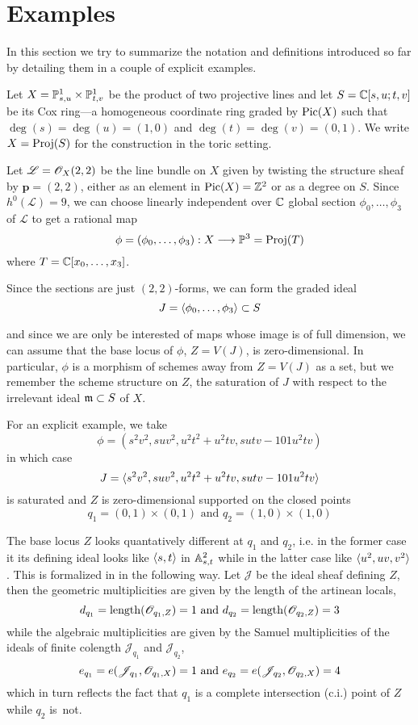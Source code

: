 \documentclass[fleqn,reqno]{amsart}
\numberwithin{first}{chapter}
\begin{document}
\section{Examples}

In this section we try to summarize the notation and definitions introduced so far
by detailing them in a couple of explicit examples.

\begin{example}[$\mt{ex203}$]
\label{ex203}
Let $X=\PP^1_{s,u}\times\PP^1_{t,v}$ be the product of two projective lines and let $S=\CC[s,u;t,v]$
be its Cox ring---a homogeneous coordinate ring graded by $\Pic(X)$ such that $\deg(s)=\deg(u)=(1,0)$
and $\deg(t)=\deg(v)=(0,1)$.
We write $X=\Proj(S)$ for the construction in the toric setting.

Let $\mathscr{L}=\O_X(2,2)$ be the line bundle on $X$ given by twisting the structure sheaf by
$\mathbf p=(2,2)$, either as an element in $\Pic(X)=\ZZ^2$ or as a degree on $S$.
Since $h^0(\mathscr{L})=9$, we can choose  linearly independent over $\CC$
global section $\phi_0,\ldots,\phi_3$ of $\mathscr{L}$ to get a rational map
\[
	\phi=(\phi_0,\ldots,\phi_3):X\To\PP^3=\Proj(T)
\]
where $T=\CC[x_0,\ldots,x_3]$.

Since the sections are just $(2,2)$-forms, we can form the graded ideal
\[
	J=\la \phi_0,\ldots,\phi_3\ra\se S
\]

and since we are only be interested of maps whose image is of full dimension,
we can assume that the base locus of $\phi$, $Z=V(J)$, is zero-dimensional.
In particular, $\phi$ is a morphism of schemes away from $Z=V(J)$ as a set,
but we remember the scheme structure on $Z$,
the saturation of $J$ with respect to the irrelevant ideal $\m\se S$ of $X$.

For an explicit example, we take
\[
	\phi=(s^{2} v^{2},s u v^{2},u^{2} t^{2}+u^{2} t v,s u t v-101 u^{2}t v)
\]
in which case
\[
	J=\la s^{2} v^{2},s u v^{2},u^{2} t^{2}+u^{2} t v,s u t v-101 u^{2}t v\ra
\]
is saturated and $Z$ is zero-dimensional supported on the closed points
\[
	q_1=(0,1)\times(0,1) \text{ and } q_2=(1,0)\times(1,0)
\]

The base locus $Z$ looks quantatively different at $q_1$ and $q_2$, i.e.
in the former case it its defining ideal looks like $\la s,t\ra$ in $\AA^2_{s,t}$
while in the latter case like $\la u^2,uv,v^2\ra$.
This is formalized in in the following way.
Let $\mathscr{J}$ be the ideal sheaf defining $Z$,
then the geometric multiplicities are given by the length of the artinean locals,
\[
	d_{q_1}=\length(\O_{q_1,Z})=1 \text{ and } d_{q_2}=\length(\O_{q_2,Z})=3
\]
while the algebraic multiplicities are given by the Samuel multiplicities
of the ideals of finite colength $\mathscr{J}_{q_1}$ and $\mathscr{J}_{q_2}$,
\[
	e_{q_1}=e(\mathscr{J}_{q_1},\O_{q_1,X})=1 \text{ and } e_{q_2}=e(\mathscr{J}_{q_2},\O_{q_2,X})=4
\]
which in turn reflects the fact that $q_1$ is a complete intersection (c.i.) point of $Z$
while $q_2$ is~not.


\end{example}
\end{document}
